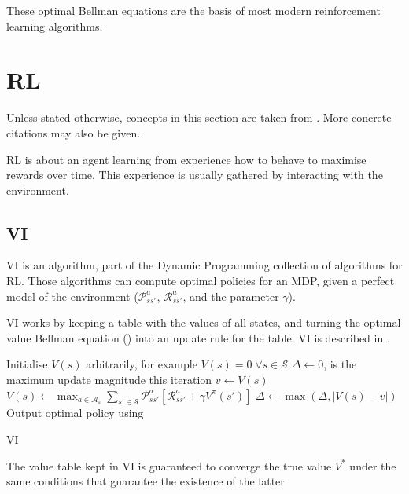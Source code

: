These optimal Bellman equations are the basis of most modern reinforcement
learning algorithms.


\section{\acl{RL}}
Unless stated otherwise, concepts in this section are taken from
\citet{sutton1998introduction}. More concrete citations may also be given.

\acf{RL} is about an agent learning from experience how to behave to maximise
rewards over time. This experience is usually gathered by interacting with the
environment.

\subsection{\acl{VI}\label{subsec:VI}}
\acf{VI} is an algorithm, part of the Dynamic Programming collection of
algorithms for \ac{RL}. Those algorithms can compute optimal policies for an
\ac{MDP}, given a perfect model of the environment ($\mathcal{P}^a_{ss'}$,
$\mathcal{R}^a_{ss'}$, and the parameter $\gamma$).

\ac{VI} works by keeping a table with the values of all states, and
turning the optimal value Bellman equation () into an
update rule for the table. \ac{VI} is described in .

\begin{algorithm}[hbtp]
\begin{algorithmic}
\State Initialise $V(s)$ arbitrarily, for example $V(s)=0 \; \forall s\in\mathcal{S}$
\Repeat
  \State $\Delta \gets 0$, is the maximum update magnitude this iteration
    \State $v \gets V(s)$
    \State $V(s) \gets \max_{a\in\mathcal{A}_s}\sum_{s' \in \mathcal{S}}\mathcal{P}^a_{ss'} \left[\mathcal{R}^a_{ss'} + \gamma V^\pi(s') \right]$
    \State $\Delta \gets \max(\Delta, \left|V(s) - v \right|)$
    \EndFor
{}
\State Output optimal policy using 
\end{algorithmic}
\caption{\acl{VI} \citep[Section~4.4]{sutton1998introduction}}
\label{alg:value-iteration}
\end{algorithm}

The value table kept in \ac{VI} is guaranteed to converge the true value $V^*$
under the same conditions that guarantee the existence of the latter

